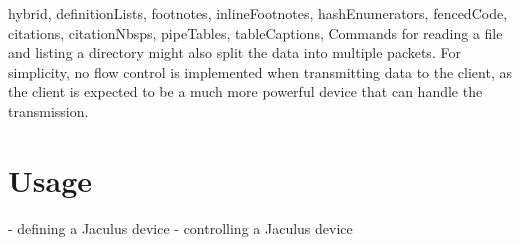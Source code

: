 \begin{markdown*}{%
  hybrid,
  definitionLists,
  footnotes,
  inlineFootnotes,
  hashEnumerators,
  fencedCode,
  citations,
  citationNbsps,
  pipeTables,
  tableCaptions,
}
Commands for reading a file and listing a directory might also split the data into multiple packets. For simplicity, no flow control is implemented when transmitting data to the client, as the client is expected to be a much more powerful device that can handle the transmission.


\section{Usage}

  - defining a Jaculus device
  - controlling a Jaculus device


\end{markdown*}
